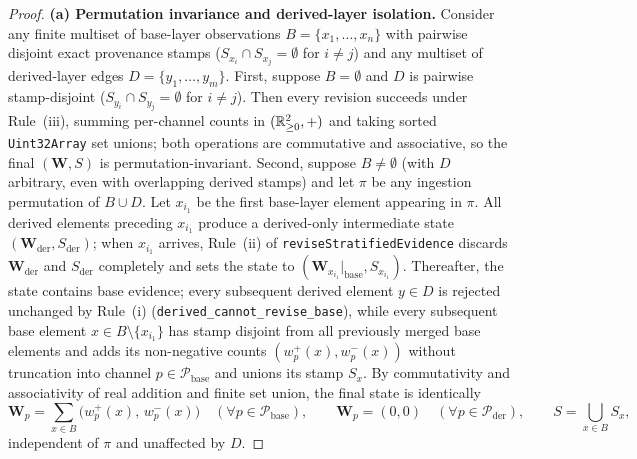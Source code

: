 \begin{proof}
\textbf{(a) Permutation invariance and derived-layer isolation.}
Consider any finite multiset of base-layer observations $B = \{x_1, \dots, x_n\}$ with pairwise disjoint exact provenance stamps ($S_{x_i} \cap S_{x_j} = \emptyset$ for $i \neq j$) and any multiset of derived-layer edges $D = \{y_1, \dots, y_m\}$.
First, suppose $B = \emptyset$ and $D$ is pairwise stamp-disjoint ($S_{y_i} \cap S_{y_j} = \emptyset$ for $i \neq j$). Then every revision succeeds under Rule~(iii), summing per-channel counts in $(\mathbb{R}_{\ge 0}^2, +)$ and taking sorted \texttt{Uint32Array} set unions; both operations are commutative and associative, so the final $(\mathbf{W}, S)$ is permutation-invariant.
Second, suppose $B \neq \emptyset$ (with $D$ arbitrary, even with overlapping derived stamps) and let $\pi$ be any ingestion permutation of $B \cup D$. Let $x_{i_1}$ be the first base-layer element appearing in $\pi$. All derived elements preceding $x_{i_1}$ produce a derived-only intermediate state $(\mathbf{W}_{\text{der}}, S_{\text{der}})$; when $x_{i_1}$ arrives, Rule~(ii) of \texttt{reviseStratifiedEvidence} discards $\mathbf{W}_{\text{der}}$ and $S_{\text{der}}$ completely and sets the state to $(\mathbf{W}_{x_{i_1}}|_{\text{base}}, S_{x_{i_1}})$. Thereafter, the state contains base evidence; every subsequent derived element $y \in D$ is rejected unchanged by Rule~(i) (\texttt{derived\_cannot\_revise\_base}), while every subsequent base element $x \in B \setminus \{x_{i_1}\}$ has stamp disjoint from all previously merged base elements and adds its non-negative counts $(w_p^+(x), w_p^-(x))$ without truncation into channel $p \in \mathcal{P}_{\text{base}}$ and unions its stamp $S_x$. By commutativity and associativity of real addition and finite set union, the final state is identically
\[
  \mathbf{W}_p = \sum_{x \in B} \big(w_p^+(x),\, w_p^-(x)\big) \quad (\forall p \in \mathcal{P}_{\text{base}}),
  \qquad \mathbf{W}_p = (0, 0) \quad (\forall p \in \mathcal{P}_{\text{der}}),
  \qquad S = \bigcup_{x \in B} S_x,
\]
independent of $\pi$ and unaffected by $D$.


\end{proof}

